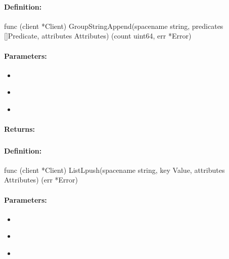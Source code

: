 \paragraph{Definition:}
\begin{gocode}
func (client *Client) GroupStringAppend(spacename string, predicates []Predicate, attributes Attributes) (count uint64, err *Error)
\end{gocode}

\paragraph{Parameters:}
\begin{itemize}[noitemsep]
\item {}\\

\item {}\\

\item {}\\

\end{itemize}

\paragraph{Returns:}


\pagebreak
\subsubsection{}
\label{api:Go:ListLpush}


\paragraph{Definition:}
\begin{gocode}
func (client *Client) ListLpush(spacename string, key Value, attributes Attributes) (err *Error)
\end{gocode}

\paragraph{Parameters:}
\begin{itemize}[noitemsep]
\item {}\\

\item {}\\

\item {}\\

\end{itemize}

